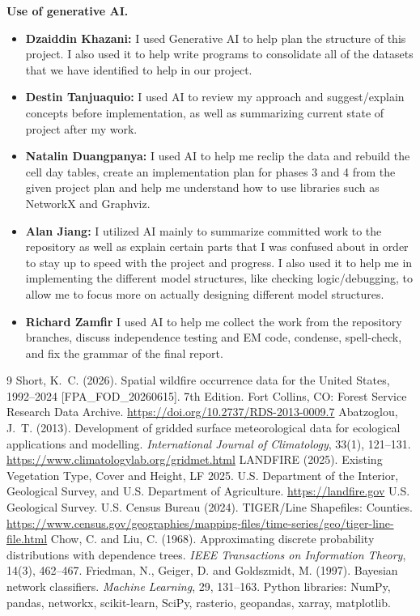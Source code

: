 \documentclass[11pt]{article}
\begin{document}
\textbf{Use of generative AI.}
\begin{itemize}\setlength{\itemsep}{1pt}\setlength{\parskip}{0pt}
  \item \textbf{Dzaiddin Khazani:} I used Generative AI to help plan the structure of this project. I also used it to help write programs to consolidate all of the datasets that we have identified to help in our project.
  \item \textbf{Destin Tanjuaquio:} I used AI to review my approach and suggest/explain concepts before implementation, as well as summarizing current state of project after my work.
  \item \textbf{Natalin Duangpanya:} I used AI to help me reclip the data and rebuild the cell day tables, create an implementation plan for phases 3 and 4 from the given project plan and help me understand how to use libraries such as NetworkX and Graphviz.
  \item \textbf{Alan Jiang:} I utilized AI mainly to summarize committed work to the repository as well as explain certain parts that I was confused about in order to stay up to speed with the project and progress. I also used it to help me in implementing the different model structures, like checking logic/debugging, to allow me to focus more on actually designing different model structures.
  \item \textbf{Richard Zamfir} I used AI to help me collect the work from the repository branches, discuss independence testing and EM code, condense, spell-check, and fix the grammar of the final report.
\end{itemize}


\begin{thebibliography}{9}
 Short, K.~C. (2026). Spatial wildfire occurrence data for the United States,
1992--2024 [FPA\_FOD\_20260615]. 7th Edition. Fort Collins, CO: Forest Service Research Data
Archive. \url{https://doi.org/10.2737/RDS-2013-0009.7}
 Abatzoglou, J.~T. (2013). Development of gridded surface meteorological data
for ecological applications and modelling. \emph{International Journal of Climatology}, 33(1), 121--131.
\url{https://www.climatologylab.org/gridmet.html}
 LANDFIRE (2025). Existing Vegetation Type, Cover and Height, LF 2025.
U.S. Department of the Interior, Geological Survey, and U.S. Department of Agriculture.
\url{https://landfire.gov}
 U.S. Geological Survey.
 U.S. Census Bureau (2024). TIGER/Line Shapefiles: Counties.
\url{https://www.census.gov/geographies/mapping-files/time-series/geo/tiger-line-file.html}
 Chow, C. and Liu, C. (1968). Approximating discrete probability distributions
with dependence trees. \emph{IEEE Transactions on Information Theory}, 14(3), 462--467.
 Friedman, N., Geiger, D. and Goldszmidt, M. (1997). Bayesian network classifiers.
\emph{Machine Learning}, 29, 131--163.
 Python libraries: NumPy, pandas, networkx, scikit-learn, SciPy, rasterio,
geopandas, xarray, matplotlib.
\end{thebibliography}
\end{document}
